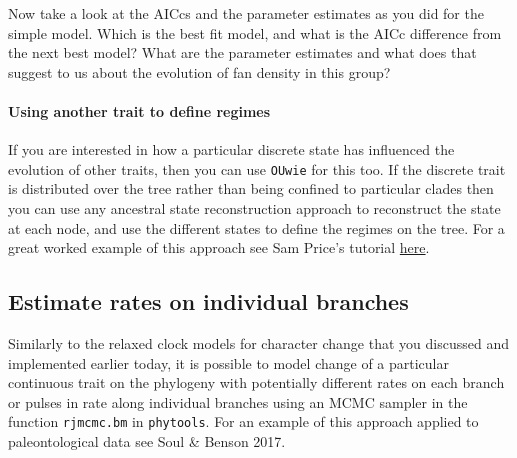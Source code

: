 \documentclass[]{article}
\newenvironment{Shaded}{\begin{snugshade}}{\end{snugshade}}
\newcommand{\KeywordTok}[1]{\textcolor[rgb]{0.13,0.29,0.53}{\textbf{#1}}}
\newcommand{\DataTypeTok}[1]{\textcolor[rgb]{0.13,0.29,0.53}{#1}}
\newcommand{\FloatTok}[1]{\textcolor[rgb]{0.00,0.00,0.81}{#1}}
\newcommand{\StringTok}[1]{\textcolor[rgb]{0.31,0.60,0.02}{#1}}
\newcommand{\CommentTok}[1]{\textcolor[rgb]{0.56,0.35,0.01}{\textit{#1}}}
\newcommand{\OtherTok}[1]{\textcolor[rgb]{0.56,0.35,0.01}{#1}}
\newcommand{\OperatorTok}[1]{\textcolor[rgb]{0.81,0.36,0.00}{\textbf{#1}}}
\newcommand{\NormalTok}[1]{#1}
\let\oldparagraph\paragraph
\renewcommand{\paragraph}[1]{\oldparagraph{#1}\mbox{}}
\begin{document}
\begin{Shaded}
\end{Shaded}

Now take a look at the AICcs and the parameter estimates as you did for
the simple model. Which is the best fit model, and what is the AICc
difference from the next best model? What are the parameter estimates
and what does that suggest to us about the evolution of fan density in
this group?

\paragraph{Using another trait to define
regimes}\label{using-another-trait-to-define-regimes}

If you are interested in how a particular discrete state has influenced
the evolution of other traits, then you can use \texttt{OUwie} for this
too. If the discrete trait is distributed over the tree rather than
being confined to particular clades then you can use any ancestral state
reconstruction approach to reconstruct the state at each node, and use
the different states to define the regimes on the tree. For a great
worked example of this approach see Sam Price's tutorial
\href{http://treethinkers.org/tutorials/state-dependent-diversification-of-traits/}{here}.

\subsection{Estimate rates on individual
branches}\label{estimate-rates-on-individual-branches}

Similarly to the relaxed clock models for character change that you
discussed and implemented earlier today, it is possible to model change
of a particular continuous trait on the phylogeny with potentially
different rates on each branch or pulses in rate along individual
branches using an MCMC sampler in the function \texttt{rjmcmc.bm} in
\texttt{phytools}. For an example of this approach applied to
paleontological data see Soul \& Benson 2017.
\end{document}
